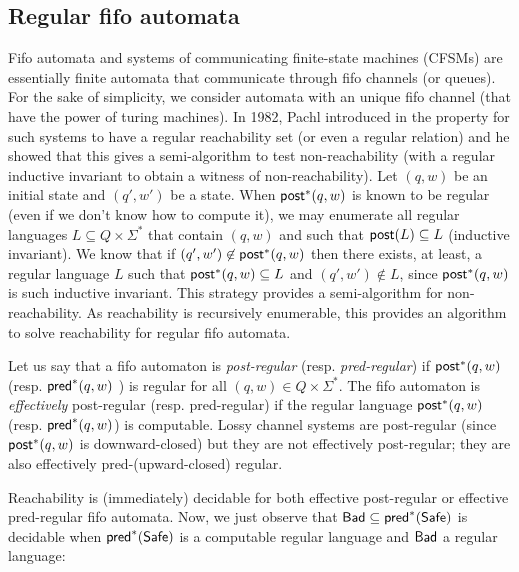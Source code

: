 %
%



\subsection{Regular fifo automata}

Fifo automata and systems of communicating finite-state machines (CFSMs) are essentially finite automata that communicate through fifo channels (or queues). For the sake of simplicity, we consider automata with an unique fifo channel (that have the power of turing machines). In 1982, Pachl introduced in \cite{DBLP:journals/corr/cs-LO-0306121} the property for such systems to have a regular reachability set (or even a regular relation) and he showed that this gives a semi-algorithm to test non-reachability (with a regular inductive invariant to obtain a witness of non-reachability). Let $(q,w)$ be an initial state and $(q',w')$ be a state. When $\textsf{post}^*(q,w)$ is known to be regular (even if we don't know how to compute it), we may enumerate all regular languages $L \subseteq Q \times \Sigma^*$ that contain $(q,w)$ and such that $\textsf{post}(L) \subseteq L$ (inductive invariant). We know that if $(q',w') \not\in \textsf{post}^*(q,w)$ then there exists, at least, a regular language $L$ such that $\textsf{post}^*(q,w) \subseteq L$ and $(q',w') \not\in L$, since $\textsf{post}^*(q,w)$ is such inductive invariant. This strategy provides a semi-algorithm for non-reachability.
As reachability is recursively enumerable, this provides an algorithm to solve reachability for regular fifo automata.

Let us say that a fifo automaton is \emph{post-regular} (resp. \emph{pred-regular}) if $\textsf{post}^*(q,w)$ (resp. $\textsf{pred}^*(q,w)$ ) is regular for all $(q,w) \in Q \times \Sigma^*$. The  fifo automaton is \emph{effectively} post-regular (resp. pred-regular) if the regular language $\textsf{post}^*(q,w)$ (resp. $\textsf{pred}^*(q,w)$) is computable. Lossy channel systems are post-regular (since $\textsf{post}^*(q,w)$ is downward-closed) but they are not effectively post-regular; they are also effectively pred-(upward-closed) regular.

Reachability is (immediately) decidable for both effective post-regular or effective pred-regular fifo automata.
%
%
%
Now, we just observe that $\textsf{Bad} \subseteq \textsf{pred}^*(\textsf{Safe})$ is decidable when $\textsf{pred}^*(\textsf{Safe})$ is a computable regular language and $\textsf{Bad}$ a regular language: 

